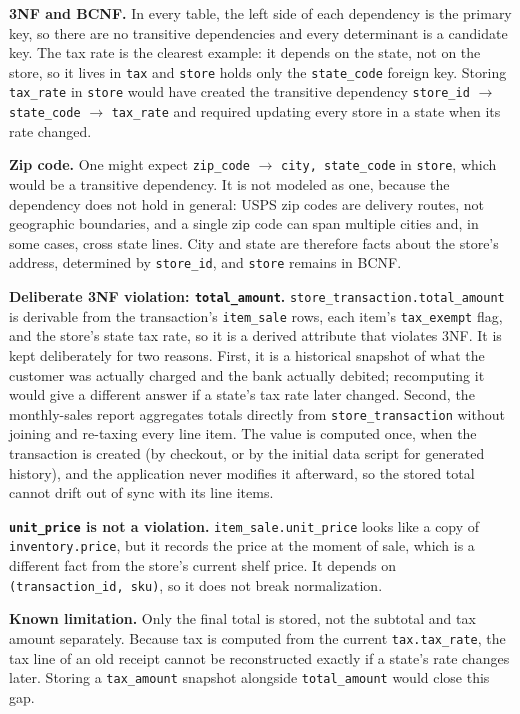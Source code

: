 \documentclass[11pt,letterpaper]{article}
\begin{document}
\textbf{3NF and BCNF.} In every table, the left side of each dependency is the primary key, so there are no transitive dependencies and every determinant is a candidate key. The tax rate is the clearest example: it depends on the state, not on the store, so it lives in \texttt{tax} and \texttt{store} holds only the \texttt{state\_code} foreign key. Storing \texttt{tax\_rate} in \texttt{store} would have created the transitive dependency \texttt{store\_id} $\rightarrow$ \texttt{state\_code} $\rightarrow$ \texttt{tax\_rate} and required updating every store in a state when its rate changed.

\textbf{Zip code.} One might expect \texttt{zip\_code} $\rightarrow$ \texttt{city, state\_code} in \texttt{store}, which would be a transitive dependency. It is not modeled as one, because the dependency does not hold in general: USPS zip codes are delivery routes, not geographic boundaries, and a single zip code can span multiple cities and, in some cases, cross state lines. City and state are therefore facts about the store's address, determined by \texttt{store\_id}, and \texttt{store} remains in BCNF.

\textbf{Deliberate 3NF violation: \texttt{total\_amount}.} \texttt{store\_transaction.total\_amount} is derivable from the transaction's \texttt{item\_sale} rows, each item's \texttt{tax\_exempt} flag, and the store's state tax rate, so it is a derived attribute that violates 3NF. It is kept deliberately for two reasons. First, it is a historical snapshot of what the customer was actually charged and the bank actually debited; recomputing it would give a different answer if a state's tax rate later changed. Second, the monthly-sales report aggregates totals directly from \texttt{store\_transaction} without joining and re-taxing every line item. The value is computed once, when the transaction is created (by checkout, or by the initial data script for generated history), and the application never modifies it afterward, so the stored total cannot drift out of sync with its line items.

\textbf{\texttt{unit\_price} is not a violation.} \texttt{item\_sale.unit\_price} looks like a copy of \texttt{inventory.price}, but it records the price at the moment of sale, which is a different fact from the store's current shelf price. It depends on \texttt{(transaction\_id, sku)}, so it does not break normalization.

\textbf{Known limitation.} Only the final total is stored, not the subtotal and tax amount separately. Because tax is computed from the current \texttt{tax.tax\_rate}, the tax line of an old receipt cannot be reconstructed exactly if a state's rate changes later. Storing a \texttt{tax\_amount} snapshot alongside \texttt{total\_amount} would close this gap.
\end{document}
